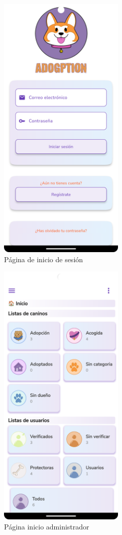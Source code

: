 \documentclass[a4paper, 12pt]{article}
\begin{document}
\begin{figure}[H]
	\begin{center}
		{\includegraphics[width=6cm]{app/Login.png}\par}
		\caption{Página de inicio de sesión}
	\end{center}
\end{figure}


\begin{figure}[H]
	\begin{center}
		{\includegraphics[width=6cm]{app/AdminHome.png}\par}
		\caption{Página inicio administrador}
	\end{center}
\end{figure}
\end{document}
